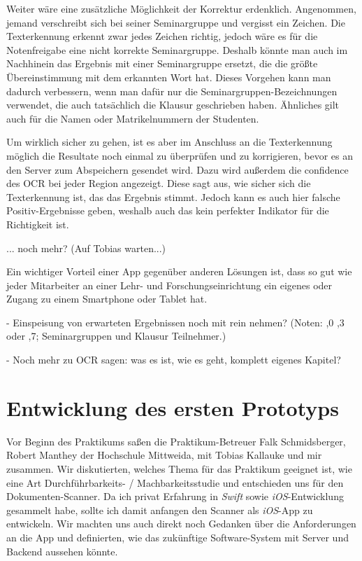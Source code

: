 \documentclass[nomenclature, 150]{HSMW-Thesis}
\begin{document}
	Weiter wäre eine zusätzliche Möglichkeit der Korrektur erdenklich. Angenommen, jemand verschreibt sich bei seiner Seminargruppe und vergisst ein Zeichen. Die Texterkennung erkennt zwar jedes Zeichen richtig, jedoch wäre es für die Notenfreigabe eine nicht korrekte Seminargruppe. Deshalb könnte man auch im Nachhinein das Ergebnis mit einer Seminargruppe ersetzt, die die größte Übereinstimmung mit dem erkannten Wort hat. Dieses Vorgehen kann man dadurch verbessern, wenn man dafür nur die Seminargruppen-Bezeichnungen verwendet, die auch tatsächlich die Klausur geschrieben haben. Ähnliches gilt auch für die Namen oder Matrikelnummern der Studenten.
	
	Um wirklich sicher zu gehen, ist es aber im Anschluss an die Texterkennung möglich die Resultate noch einmal zu überprüfen und zu korrigieren, bevor es an den Server zum Abspeichern gesendet wird. Dazu wird außerdem die confidence des OCR bei jeder Region angezeigt. Diese sagt aus, wie sicher sich die Texterkennung ist, das das Ergebnis stimmt. Jedoch kann es auch hier falsche Positiv-Ergebnisse geben, weshalb auch das kein perfekter Indikator für die Richtigkeit ist.
	
	... noch mehr? (Auf Tobias warten...)
	
	Ein wichtiger Vorteil einer App gegenüber anderen Lösungen ist, dass so gut wie jeder Mitarbeiter an einer Lehr- und Forschungseinrichtung ein eigenes oder Zugang zu einem Smartphone oder Tablet hat.

	- Einspeisung von erwarteten Ergebnissen noch mit rein nehmen? (Noten: ,0 ,3 oder ,7; Seminargruppen und Klausur Teilnehmer.)
	
	- Noch mehr zu OCR sagen: was es ist, wie es geht, komplett eigenes Kapitel?


	
\chapter{Entwicklung des ersten Prototyps}
	Vor Beginn des Praktikums saßen die Praktikum-Betreuer Falk Schmidsberger, Robert Manthey der Hochschule Mittweida, mit Tobias Kallauke und mir zusammen. Wir diskutierten, welches Thema für das Praktikum geeignet ist, wie eine Art Durchführbarkeits- / Machbarkeitsstudie und entschieden uns für den Dokumenten-Scanner. Da ich privat Erfahrung in \textit{Swift} sowie \textit{iOS}-Entwicklung gesammelt habe, sollte ich damit anfangen den Scanner als \textit{iOS}-App zu entwickeln. Wir machten uns auch direkt noch Gedanken über die Anforderungen an die App und definierten, wie das zukünftige Software-System mit Server und Backend aussehen könnte.
\end{document}
